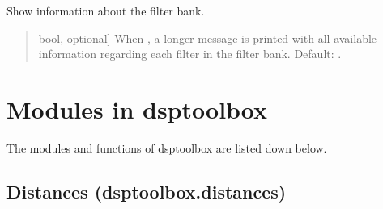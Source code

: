 \documentclass[letterpaper,10pt,english]{sphinxmanual}
\begin{document}
\begin{fulllineitems}
\begin{fulllineitems}
\end{fulllineitems}


\begin{fulllineitems}
\label{\detokenize{classes:dsptoolbox.classes.filterbank.FilterBank.show_info}}
\pysigstartsignatures
{}
\pysigstopsignatures
\sphinxAtStartPar
Show information about the filter bank.
\begin{quote}\begin{description}
\begin{description}
\sphinxlineitem{\sphinxstylestrong{show\_filters\_info}}{[}bool, optional{]}
\sphinxAtStartPar
When , a longer message is printed with all available
information regarding each filter in the filter bank.
Default: .

\end{description}

\end{description}\end{quote}

\end{fulllineitems}


\end{fulllineitems}


\sphinxstepscope


\chapter{Modules in dsptoolbox}
\label{\detokenize{modules:modules-in-dsptoolbox}}\label{\detokenize{modules::doc}}
\sphinxAtStartPar
The modules and functions of dsptoolbox are listed down below.

\sphinxstepscope


\section{Distances (dsptoolbox.distances)}
\label{\detokenize{modules/dsptoolbox.distances:module-dsptoolbox.distances}}\label{\detokenize{modules/dsptoolbox.distances:distances-dsptoolbox-distances}}\label{\detokenize{modules/dsptoolbox.distances::doc}}
\end{document}
